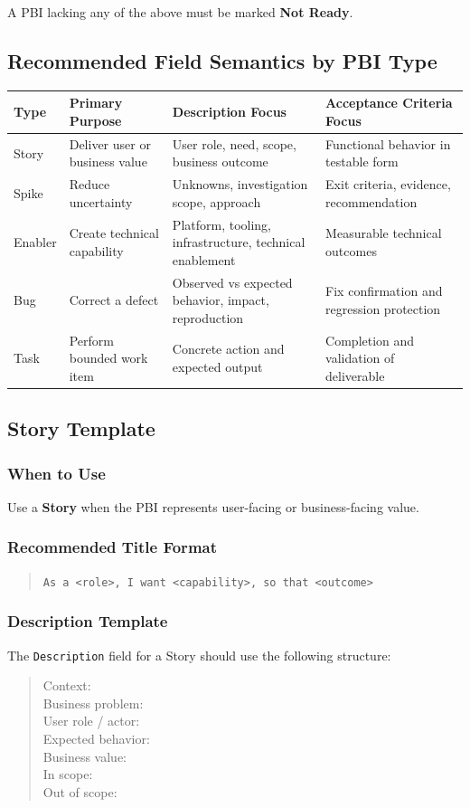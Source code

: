 \documentclass[11pt,a4paper]{article}
\begin{document}
A PBI lacking any of the above must be marked \textbf{Not Ready}.

\subsection{Recommended Field Semantics by PBI Type}

\begin{longtable}{|p{2.2cm}|p{3.0cm}|p{4.2cm}|p{4.2cm}|}
\hline
\textbf{Type} & \textbf{Primary Purpose} & \textbf{Description Focus} & \textbf{Acceptance Criteria Focus} \\
\hline
Story & Deliver user or business value & User role, need, scope, business outcome & Functional behavior in testable form \\
\hline
Spike & Reduce uncertainty & Unknowns, investigation scope, approach & Exit criteria, evidence, recommendation \\
\hline
Enabler & Create technical capability & Platform, tooling, infrastructure, technical enablement & Measurable technical outcomes \\
\hline
Bug & Correct a defect & Observed vs expected behavior, impact, reproduction & Fix confirmation and regression protection \\
\hline
Task & Perform bounded work item & Concrete action and expected output & Completion and validation of deliverable \\
\hline
\end{longtable}


\subsection{Story Template}

\subsubsection*{When to Use}
Use a \textbf{Story} when the PBI represents user-facing or business-facing value.

\subsubsection*{Recommended Title Format}
\begin{quote}
\texttt{As a <role>, I want <capability>, so that <outcome>}
\end{quote}

\subsubsection*{Description Template}
The \texttt{Description} field for a Story should use the following structure:
\begin{quote}
Context: \\
Business problem: \\
User role / actor: \\
Expected behavior: \\
Business value: \\
In scope: \\
Out of scope:
\end{quote}
\end{document}
